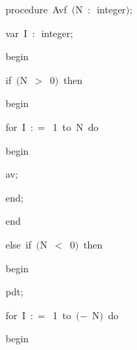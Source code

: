 {
\parindent {}
\medskip

\pagebreak[3] 
\vspace{\neglskip}\mbox{\blc  \blk\idt  \mcl procedure\idt \ Avf\ $($N\ $:$\ integer$)$$;$}\par 
\pagebreak[3] 
\vspace{\neglskip}\mbox{\blc  \blk\blk\idt  \mcl var\idt \ I\ $:$\ integer$;$}\par 
\vspace{\neglskip}\mbox{\blc  \blk\idt  \mcl begin\idt }\par 
\pagebreak[3] 
\vspace{\neglskip}\mbox{\blc  \blk\blk\idt  \mcl if\idt \ $($N\ $>$\ 0$)$\ \mcl then\idt }\par 
\vspace{\neglskip}\mbox{\blc  \blk\blk\blk\idt  \mcl begin\idt }\par 
\pagebreak[3] 
\vspace{\neglskip}\mbox{\blc  \blk\blk\blk\blk\idt  \mcl for\idt \ I\ $:$$=$\ 1\ \mcl to\idt \ N\ \mcl do\idt }\par 
\vspace{\neglskip}\mbox{\blc  \blk\blk\blk\blk\blk\idt  \mcl begin\idt }\par 
\vspace{\neglskip}\mbox{\blc  \blk\blk\blk\blk\blk\blk\idt  av$;$}\par 
\vspace{\neglskip}\mbox{\blc  \blk\blk\blk\blk\blk\idt  \mcl end\idt $;$}\par 
\vspace{\neglskip}\mbox{\blc  \blk\blk\blk\idt  \mcl end\idt }\par 
\pagebreak[3] 
\vspace{\neglskip}\mbox{\blc  \blk\blk\idt  \mcl else\idt \ \mcl if\idt \ $($N\ $<$\ 0$)$\ \mcl then\idt }\par 
\vspace{\neglskip}\mbox{\blc  \blk\blk\blk\idt  \mcl begin\idt }\par 
\vspace{\neglskip}\mbox{\blc  \blk\blk\blk\blk\idt  pdt$;$\ }\par 
\pagebreak[3] 
\vspace{\neglskip}\mbox{\blc  \blk\blk\blk\blk\idt  \mcl for\idt \ I\ $:$$=$\ 1\ \mcl to\idt \ $($$-$\ N$)$\ \mcl do\idt }\par 
\vspace{\neglskip}\mbox{\blc  \blk\blk\blk\blk\blk\idt  \mcl begin\idt }\par 
}
